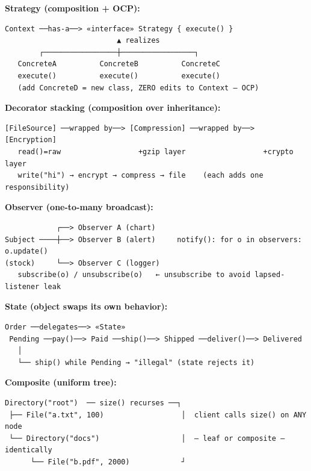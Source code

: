 \documentclass[11pt]{article}
\begin{document}
\textbf{Strategy (composition + OCP):}

\setcodelang{}

\begin{verbatim}
Context ──has-a──> «interface» Strategy { execute() }
                          ▲ realizes
        ┌─────────────────┼─────────────────┐
   ConcreteA          ConcreteB          ConcreteC
   execute()          execute()          execute()
   (add ConcreteD = new class, ZERO edits to Context — OCP)
\end{verbatim}

\textbf{Decorator stacking (composition over inheritance):}

\setcodelang{}

\begin{verbatim}
[FileSource] ──wrapped by──> [Compression] ──wrapped by──> [Encryption]
   read()=raw                  +gzip layer                  +crypto layer
   write("hi") → encrypt → compress → file    (each adds one responsibility)
\end{verbatim}

\textbf{Observer (one-to-many broadcast):}

\setcodelang{}

\begin{verbatim}
            ┌──> Observer A (chart)
Subject ────┼──> Observer B (alert)     notify(): for o in observers: o.update()
(stock)     └──> Observer C (logger)
   subscribe(o) / unsubscribe(o)   ← unsubscribe to avoid lapsed-listener leak
\end{verbatim}

\textbf{State (object swaps its own behavior):}

\setcodelang{}

\begin{verbatim}
Order ──delegates──> «State»
 Pending ──pay()──> Paid ──ship()──> Shipped ──deliver()──> Delivered
   │                                                          
   └── ship() while Pending → "illegal" (state rejects it)
\end{verbatim}

\textbf{Composite (uniform tree):}

\setcodelang{}

\begin{verbatim}
Directory("root")  ── size() recurses ──┐
 ├── File("a.txt", 100)                  │  client calls size() on ANY node
 └── Directory("docs")                   │  — leaf or composite — identically
      └── File("b.pdf", 2000)            ┘
\end{verbatim}
\end{document}
